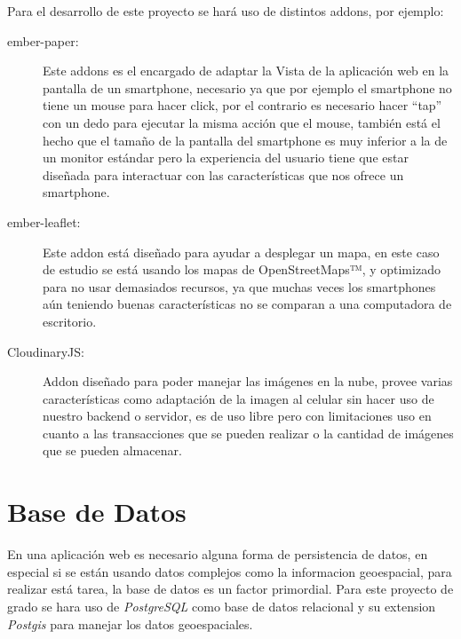 Para el desarrollo de este proyecto se hará uso de distintos addons, por ejemplo:

\begin{description}
  \item[ember-paper:] Este addons es el encargado de adaptar la Vista de la aplicación web en la pantalla de un smartphone, necesario ya que por ejemplo el smartphone no tiene un mouse para hacer click, por el contrario es necesario hacer “tap” con un dedo para ejecutar la misma acción que el mouse, también está el hecho que el tamaño de la pantalla del smartphone es muy inferior a la de un monitor estándar pero la experiencia del usuario tiene que estar diseñada para interactuar con las características que nos ofrece un smartphone.

  \item[ember-leaflet:] Este addon está diseñado para ayudar a desplegar un mapa, en este caso de estudio se está usando los mapas de OpenStreetMaps™, y optimizado para no usar demasiados recursos, ya que muchas veces los smartphones aún teniendo buenas características no se comparan a una computadora de escritorio.

  \item[CloudinaryJS:] Addon diseñado para poder manejar las imágenes en la nube, provee varias características como adaptación de la imagen al celular sin hacer uso de nuestro backend o servidor, es de uso libre pero con limitaciones uso en cuanto a las transacciones que se pueden realizar o la cantidad de imágenes que se pueden almacenar.

\end{description}




  \section{Base de Datos} %
  \label{sec:base_de_datos}

  En una aplicación web es necesario alguna forma de persistencia de datos, en especial si se están usando datos complejos como la informacion geoespacial, para realizar está tarea, la base de datos es un factor primordial.  Para este proyecto de grado se hara uso de \emph{PostgreSQL} como base de datos relacional y su extension \emph{Postgis} para manejar los datos geoespaciales.\\

